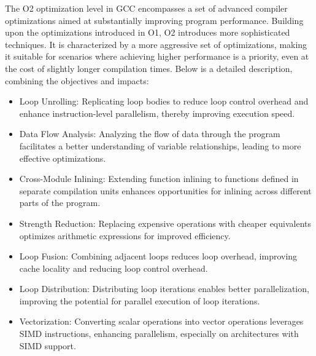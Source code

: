 \documentclass[conference]{IEEEtran}
\begin{document}
The O2 optimization level in GCC encompasses a set of advanced compiler optimizations aimed at substantially improving program performance. Building upon the optimizations introduced in O1, O2 introduces more sophisticated techniques. It is characterized by a more aggressive set of optimizations, making it suitable for scenarios where achieving higher performance is a priority, even at the cost of slightly longer compilation times. Below is a detailed description, combining the objectives and impacts:
\begin{itemize}
	\item Loop Unrolling: Replicating loop bodies to reduce loop control overhead and enhance instruction-level parallelism, thereby improving execution speed.
	\item Data Flow Analysis: Analyzing the flow of data through the program facilitates a better understanding of variable relationships, leading to more effective optimizations.
	\item Cross-Module Inlining: Extending function inlining to functions defined in separate compilation units enhances opportunities for inlining across different parts of the program.
	\item Strength Reduction: Replacing expensive operations with cheaper equivalents optimizes arithmetic expressions for improved efficiency.
	\item Loop Fusion: Combining adjacent loops reduces loop overhead, improving cache locality and reducing loop control overhead.
	\item Loop Distribution: Distributing loop iterations enables better parallelization, improving the potential for parallel execution of loop iterations.
	\item Vectorization: Converting scalar operations into vector operations leverages SIMD instructions, enhancing parallelism, especially on architectures with SIMD support.
\end{itemize}
\end{document}
